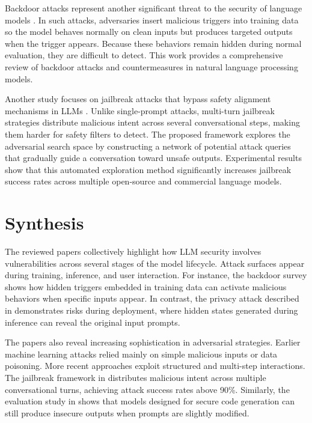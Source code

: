 \documentclass[12pt]{article}
\begin{document}
Backdoor attacks represent another significant threat to the security of language models \cite{backdoorsurvey}. In such attacks, adversaries insert malicious triggers into training data so the model behaves normally on clean inputs but produces targeted outputs when the trigger appears. Because these behaviors remain hidden during normal evaluation, they are difficult to detect. This work provides a comprehensive review of backdoor attacks and countermeasures in natural language processing models.

Another study focuses on jailbreak attacks that bypass safety alignment mechanisms in LLMs \cite{nexus}. Unlike single-prompt attacks, multi-turn jailbreak strategies distribute malicious intent across several conversational steps, making them harder for safety filters to detect. The proposed framework explores the adversarial search space by constructing a network of potential attack queries that gradually guide a conversation toward unsafe outputs. Experimental results show that this automated exploration method significantly increases jailbreak success rates across multiple open-source and commercial language models.

\section{Synthesis}

The reviewed papers collectively highlight how LLM security involves vulnerabilities across several stages of the model lifecycle. Attack surfaces appear during training, inference, and user interaction. For instance, the backdoor survey \cite{backdoorsurvey} shows how hidden triggers embedded in training data can activate malicious behaviors when specific inputs appear. In contrast, the privacy attack described in \cite{hiddennomore} demonstrates risks during deployment, where hidden states generated during inference can reveal the original input prompts.

The papers also reveal increasing sophistication in adversarial strategies. Earlier machine learning attacks relied mainly on simple malicious inputs or data poisoning. More recent approaches exploit structured and multi-step interactions. The jailbreak framework in \cite{nexus} distributes malicious intent across multiple conversational turns, achieving attack success rates above 90\%. Similarly, the evaluation study in \cite{securecode} shows that models designed for secure code generation can still produce insecure outputs when prompts are slightly modified.
\end{document}
